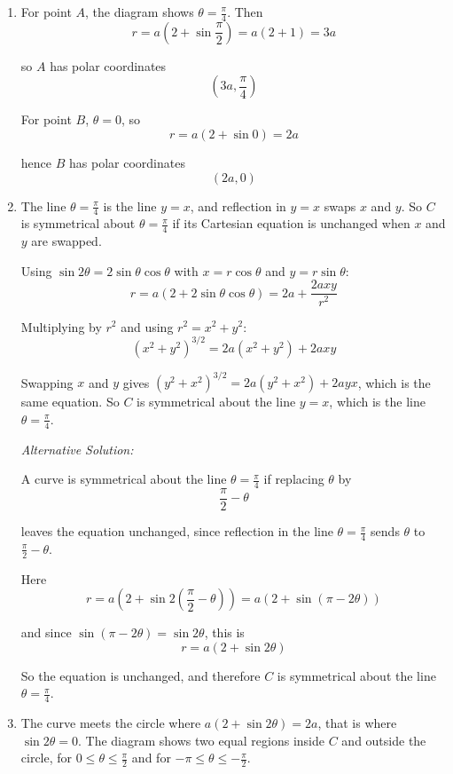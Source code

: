 \documentclass[leqno]{article}
\begin{document}
\begin{enumerate}[
	  label=\textbf{\arabic*.},
	  leftmargin=*,
	  topsep=0pt,
	  partopsep=0pt,
	  parsep=0pt
	]
	\vspace*{10pt}
	
	\begin{djsSolution}
	\begin{enumerate}[label=\textbf{(\alph*)}]
	  \item For point $A$, the diagram shows $\theta=\frac{\pi}{4}$. Then
	  \[
	  r=a\left(2+\sin\frac{\pi}{2}\right)=a(2+1)=3a
	  \]

	  so $A$ has polar coordinates
	  \[
	  \left(3a,\frac{\pi}{4}\right)
	  \]
	
	  For point $B$, $\theta=0$, so
	  \[
	  r=a(2+\sin 0)=2a
	  \]

	  hence $B$ has polar coordinates
	  \[
	  (2a,0)
	  \]
	
	  \item The line $\theta=\frac{\pi}{4}$ is the line $y=x$, and reflection in $y=x$ swaps $x$ and $y$. So $C$ is symmetrical about $\theta=\frac{\pi}{4}$ if its Cartesian equation is unchanged when $x$ and $y$ are swapped.

	  Using $\sin 2\theta=2\sin\theta\cos\theta$ with $x=r\cos\theta$ and $y=r\sin\theta$:
	  \[
	  r=a(2+2\sin\theta\cos\theta)=2a+\frac{2axy}{r^2}
	  \]

	  Multiplying by $r^2$ and using $r^2=x^2+y^2$:
	  \[
	  \left(x^2+y^2\right)^{3/2}=2a\left(x^2+y^2\right)+2axy
	  \]

	  Swapping $x$ and $y$ gives $\left(y^2+x^2\right)^{3/2}=2a\left(y^2+x^2\right)+2ayx$, which is the same equation. So $C$ is symmetrical about the line $y=x$, which is the line $\theta=\frac{\pi}{4}$.

	  \medskip

	  \textit{Alternative Solution:}

	  A curve is symmetrical about the line $\theta=\frac{\pi}{4}$ if replacing $\theta$ by
	  \[
	  \frac{\pi}{2}-\theta
	  \]

	  leaves the equation unchanged, since reflection in the line $\theta=\frac{\pi}{4}$ sends $\theta$ to $\frac{\pi}{2}-\theta$.
	
	  Here
	  \[
	  r=a\left(2+\sin 2\left(\frac{\pi}{2}-\theta\right)\right)
	  =a\left(2+\sin(\pi-2\theta)\right)
	  \]

	  and since $\sin(\pi-2\theta)=\sin 2\theta$, this is
	  \[
	  r=a(2+\sin 2\theta)
	  \]
	
	  So the equation is unchanged, and therefore $C$ is symmetrical about the line $\theta=\frac{\pi}{4}$.
	
	  \item The curve meets the circle where $a(2+\sin 2\theta)=2a$, that is where $\sin 2\theta=0$. The diagram shows two equal regions inside $C$ and outside the circle, for $0\le \theta \le \frac{\pi}{2}$ and for $-\pi\le \theta \le -\frac{\pi}{2}$.
	

\end{enumerate}
\end{djsSolution}
\end{enumerate}
\end{document}
